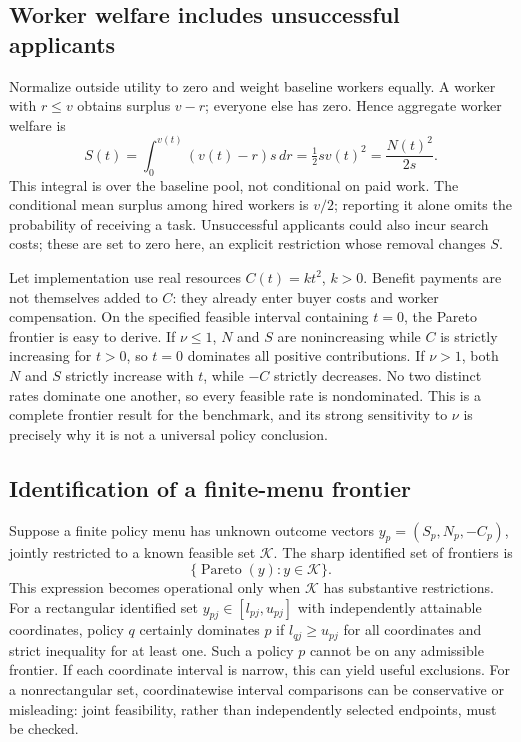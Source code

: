 \documentclass[11pt]{article}
\begin{document}
\subsection*{Worker welfare includes unsuccessful applicants}
Normalize outside utility to zero and weight baseline workers equally.
A worker with $r\leq v$ obtains surplus $v-r$; everyone else has zero.
Hence aggregate worker welfare is
\[
 S(t)=\int_0^{v(t)}(v(t)-r)s\,dr
      =\tfrac12s v(t)^2=\frac{N(t)^2}{2s}.
\]
This integral is over the baseline pool, not conditional on paid work.
The conditional mean surplus among hired workers is $v/2$; reporting it
alone omits the probability of receiving a task. Unsuccessful applicants
could also incur search costs; these are set to zero here, an explicit
restriction whose removal changes $S$.

Let implementation use real resources $C(t)=k t^2$, $k>0$. Benefit
payments are not themselves added to $C$: they already enter buyer costs
and worker compensation. On the specified feasible interval containing
$t=0$, the Pareto frontier is easy to derive. If $\nu\leq1$, $N$ and $S$
are nonincreasing while $C$ is strictly increasing for $t>0$, so $t=0$
dominates all positive contributions. If $\nu>1$, both $N$ and $S$
strictly increase with $t$, while $-C$ strictly decreases. No two distinct
rates dominate one another, so every feasible rate is nondominated.
This is a complete frontier result for the benchmark, and its strong
sensitivity to $\nu$ is precisely why it is not a universal policy conclusion.

\subsection*{Identification of a finite-menu frontier}
Suppose a finite policy menu has unknown outcome vectors
$y_p=(S_p,N_p,-C_p)$, jointly restricted to a known feasible set $\mathcal K$.
The sharp identified set of frontiers is
\[
 \{\operatorname{Pareto}(y):y\in\mathcal K\}.
\]
This expression becomes operational only when $\mathcal K$ has substantive
restrictions. For a rectangular identified set
$y_{pj}\in[l_{pj},u_{pj}]$ with independently attainable coordinates,
policy $q$ certainly dominates $p$ if
$l_{qj}\geq u_{pj}$ for all coordinates and strict inequality for at least
one. Such a policy $p$ cannot be on any admissible frontier. If each
coordinate interval is narrow, this can yield useful exclusions.
For a nonrectangular set, coordinatewise interval comparisons can be
conservative or misleading: joint feasibility, rather than independently
selected endpoints, must be checked.
\end{document}
